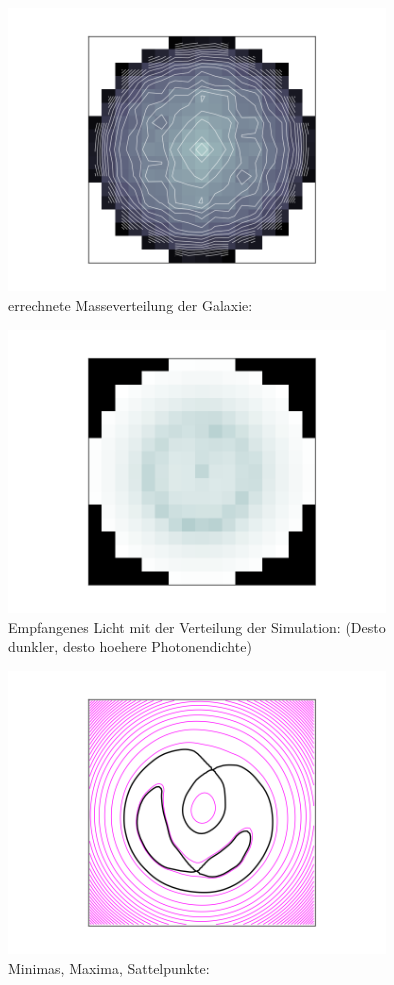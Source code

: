 \documentclass[pdftex,12pt,a4paper]{article}
\begin{document}
\begin{figure}[position=h]
\centering
 \caption{errechnete Masseverteilung der Galaxie:}
 \includegraphics[width=10cm]{Bilder/workoutput3}%
\end{figure}

\begin{figure}[position=h]
\centering
 \caption{Empfangenes Licht mit der Verteilung der Simulation:\newline
  (Desto dunkler, desto hoehere Photonendichte)}
 \includegraphics[width=10cm]{Bilder/workoutput2}%
\end{figure}

\begin{figure}[position=h]
\centering
 \caption{Minimas, Maxima, Sattelpunkte:}
 \includegraphics[width=10cm]{Bilder/workoutput1}%
\end{figure}
\end{document}
